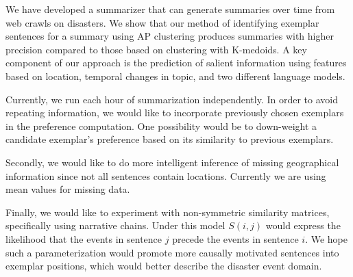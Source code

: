 \documentclass{sig-alternate} \usepackage{url} \usepackage{color}
\begin{document}
We have developed a summarizer that can generate summaries over time from web
crawls on disasters. We show that our method of identifying exemplar sentences
for a summary using AP clustering produces  summaries with higher precision
    compared to those based on clustering with K-medoids. A key component of
    our approach is the prediction of salient information using features based
    on location, temporal changes in topic, and two different language models.

Currently, we run each hour of summarization independently. In order to avoid
repeating information, we would like to incorporate previously chosen
exemplars in the preference computation. One possibility would be to
down-weight a candidate exemplar's preference based on its similarity to
previous exemplars.

Secondly, we would like to do more intelligent inference of missing
geographical information since not all sentences contain locations. Currently
we are using mean values for missing data.

Finally, we would like to experiment with non-symmetric similarity matrices,
specifically using narrative chains\cite{chambers2009unsupervised}. Under this
model $S(i,j)$ would express the likelihood that the events in sentence $j$
precede the events in sentence $i$. We hope such a parameterization would
promote more causally motivated sentences into exemplar positions, which would
better describe the disaster event domain.

%


%
%
\end{document}
